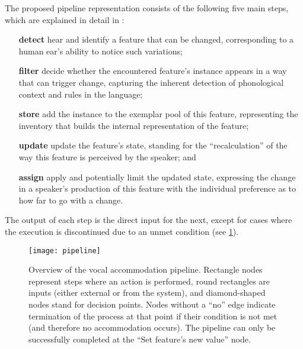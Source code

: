 The proposed pipeline representation consists of the following five main steps, which are explained in detail in :
%
\begin{itemize}[topsep=0cm, itemsep=-.1cm, wide=0cm, leftmargin=!, labelwidth=]
	\item[\textbf{detect}] hear and identify a feature that can be changed, corresponding to a human ear's ability to notice such variations;
	
	\item[\textbf{filter}] decide whether the encountered feature's instance appears in a way that can trigger change, capturing the inherent detection of phonological context and rules in the language;
	
	\item[\textbf{store}] add the instance to the exemplar pool of this feature, representing the inventory that builds the internal representation of the feature;
	
	\item[\textbf{update}] update the feature's state, standing for the \enquote{recalculation} of the way this feature is perceived by the speaker; and
	
	\item[\textbf{assign}] apply and potentially limit the updated state, expressing the change in a speaker's production of this feature with the individual preference as to how far to go with a change.
\end{itemize}
%
The output of each step is the direct input for the next, except for cases where the execution is discontinued due to an unmet condition (see \cref{fig:adaptation_module_pipeline}).
%
\begin{figure}[t]
	\centering
	\texttt{[image: pipeline]}
	\caption[Phonetic convergence algorithm pipeline]
		{Overview of the vocal accommodation pipeline.
		Rectangle nodes represent steps where an action is performed, round rectangles are inputs (either external or from the system), and diamond-shaped nodes stand for decision points.
		Nodes without a \enquote{no} edge indicate termination of the process at that point if their condition is not met (and therefore no accommodation occurs).
		The pipeline can only be successfully completed at the \enquote{Set feature's new value} node.}
	\label{fig:adaptation_module_pipeline}
\end{figure}

